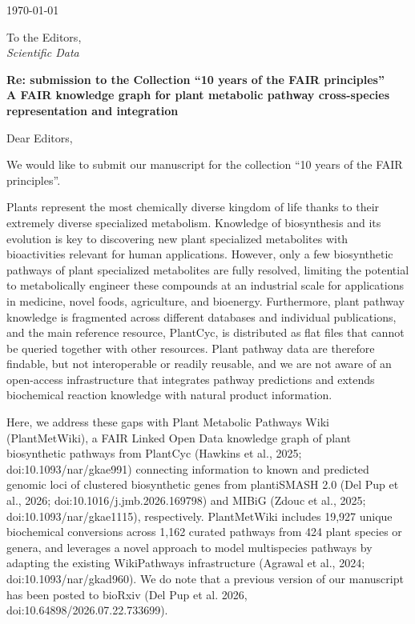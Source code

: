 \documentclass[11pt,a4paper]{article}
\begin{document}
\hfill \today

\vspace{1em}
To the Editors,\\
\textit{Scientific Data}

\vspace{0.5em}
\textbf{Re: submission to the Collection ``10 years of the FAIR principles''}\\
\textbf{A FAIR knowledge graph for plant metabolic pathway cross-species
representation and integration}

\vspace{1em}
Dear Editors,

We would like to submit our manuscript for the collection ``10 years of the FAIR principles''.

Plants represent the most chemically diverse kingdom of life thanks to their extremely diverse
specialized metabolism. Knowledge of biosynthesis and its evolution is key to discovering new plant
specialized metabolites with bioactivities relevant for human applications. However, only a few biosynthetic pathways of plant specialized metabolites
are fully resolved, limiting the potential to metabolically engineer these compounds at an
industrial scale for applications in medicine, novel foods, agriculture, and bioenergy. Furthermore,
plant pathway knowledge is fragmented across different databases and individual publications, and
the main reference resource, PlantCyc, is distributed as flat files that cannot be queried together
with other resources. Plant pathway data are therefore findable, but not interoperable or readily
reusable, and we are not aware of an open-access infrastructure that integrates pathway predictions
and extends biochemical reaction knowledge with natural product information.

Here, we address these gaps with Plant Metabolic Pathways Wiki (PlantMetWiki), a FAIR Linked Open
Data knowledge graph of plant biosynthetic pathways from PlantCyc (Hawkins et al., 2025;
doi:10.1093/nar/gkae991) connecting information to known and predicted genomic loci of clustered
biosynthetic genes from plantiSMASH 2.0 (Del Pup et al., 2026; doi:10.1016/j.jmb.2026.169798) and
MIBiG (Zdouc et al., 2025; doi:10.1093/nar/gkae1115), respectively. PlantMetWiki includes 19,927
unique biochemical conversions across 1,162 curated pathways from 424 plant species or genera, and
leverages a novel approach to model multispecies pathways by adapting the existing WikiPathways
infrastructure (Agrawal et al., 2024; doi:10.1093/nar/gkad960). We do note that a previous version of our manuscript has been posted to bioRxiv (Del Pup et al. 2026, doi:10.64898/2026.07.22.733699).
\end{document}
